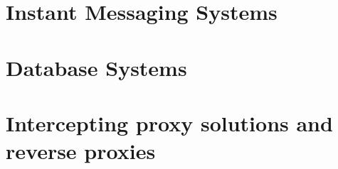 \section{Instant Messaging Systems}



\section{Database Systems}



\section{Intercepting proxy solutions and reverse proxies}
 



